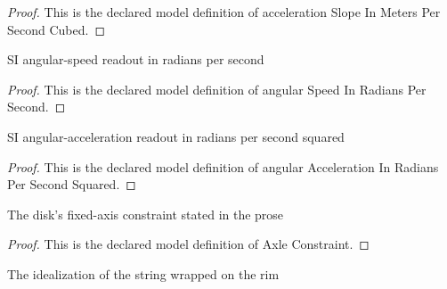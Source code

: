 \begin{proof}
  This is the declared model definition of acceleration Slope In Meters Per Second Cubed.
\end{proof}
\begin{definition}
  \label{def:physics:phyx-mini-0772:phyxminiproblems-problemphyxmini0772-angularspeedinradianspersecond}
  SI angular-speed readout in radians per second
\end{definition}
\begin{proof}
  This is the declared model definition of angular Speed In Radians Per Second.
\end{proof}
\begin{definition}
  \label{def:physics:phyx-mini-0772:phyxminiproblems-problemphyxmini0772-angularaccelerationinradianspersecondsquared}
  SI angular-acceleration readout in radians per second squared
\end{definition}
\begin{proof}
  This is the declared model definition of angular Acceleration In Radians Per Second Squared.
\end{proof}
\begin{definition}
  \label{def:physics:phyx-mini-0772:phyxminiproblems-problemphyxmini0772-axleconstraint}
  The disk's fixed-axis constraint stated in the prose
\end{definition}
\begin{proof}
  This is the declared model definition of Axle Constraint.
\end{proof}
\begin{definition}
  \label{def:physics:phyx-mini-0772:phyxminiproblems-problemphyxmini0772-stringmodel}
  The idealization of the string wrapped on the rim
\end{definition}
